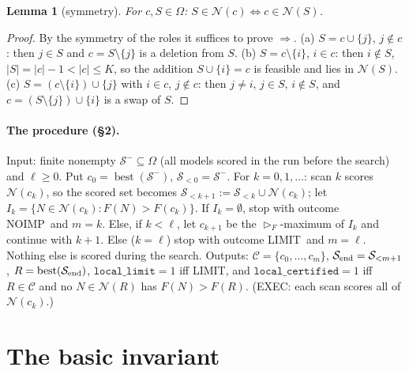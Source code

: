 \documentclass[11pt]{article}
\newtheorem{lemma}{Lemma}
\theoremstyle{remark}
\newcommand{\cS}{\mathcal{S}}
\newcommand{\cN}{\mathcal{N}}
\newcommand{\cC}{\mathcal{C}}
\newcommand{\best}{\operatorname{best}}
\newcommand{\NOIMP}{\textsf{NOIMP}}
\newcommand{\LIMIT}{\textsf{LIMIT}}
\newcommand{\cert}{\texttt{local\_certified}}
\newcommand{\llim}{\texttt{local\_limit}}
\begin{document}
\begin{lemma}[symmetry]\label{lem:sym}
For $c,S\in\Omega$: $S\in\cN(c)\iff c\in\cN(S)$.
\end{lemma}
\begin{proof}
By the symmetry of the roles it suffices to prove $\Rightarrow$. (a) $S=c\cup\{j\}$, $j\notin c$: then $j\in S$ and $c=S\setminus\{j\}$ is a deletion from $S$. (b) $S=c\setminus\{i\}$, $i\in c$: then $i\notin S$, $|S|=|c|-1<|c|\le K$, so the addition $S\cup\{i\}=c$ is feasible and lies in $\cN(S)$. (c) $S=(c\setminus\{i\})\cup\{j\}$ with $i\in c$, $j\notin c$: then $j\ne i$, $j\in S$, $i\notin S$, and $c=(S\setminus\{j\})\cup\{i\}$ is a swap of $S$.
\end{proof}

\paragraph{The procedure (\S2).} Input: finite nonempty $\cS^-\subseteq\Omega$ (all models scored in the run before the search) and $\ell\ge0$. Put $c_0=\best(\cS^-)$, $\cS_{<0}=\cS^-$. For $k=0,1,\dots$: scan $k$ scores $\cN(c_k)$, so the scored set becomes $\cS_{<k+1}:=\cS_{<k}\cup\cN(c_k)$; let $I_k=\{N\in\cN(c_k):F(N)>F(c_k)\}$. If $I_k=\emptyset$, stop with outcome \NOIMP\ and $m=k$. Else, if $k<\ell$, let $c_{k+1}$ be the $\rhd_F$-maximum of $I_k$ and continue with $k+1$. Else ($k=\ell$) stop with outcome \LIMIT\ and $m=\ell$. Nothing else is scored during the search. Outputs: $\cC=\{c_0,\dots,c_m\}$, $\cS_{\rm end}=\cS_{<m+1}$, $R=\best(\cS_{\rm end})$, $\llim=1$ iff \LIMIT, and $\cert=1$ iff $R\in\cC$ and no $N\in\cN(R)$ has $F(N)>F(R)$. (EXEC: each scan scores all of $\cN(c_k)$.)

\section{The basic invariant}
\end{document}
